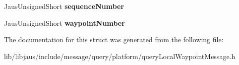 \begin{DoxyCompactItemize}
\item 
\hypertarget{struct_query_local_waypoint_message_struct_a9939e85c8d9f662b7c805a2e00319ef4}{\-Jaus\-Unsigned\-Short {\bfseries sequence\-Number}}\label{struct_query_local_waypoint_message_struct_a9939e85c8d9f662b7c805a2e00319ef4}

\item 
\hypertarget{struct_query_local_waypoint_message_struct_afbb14011b3d968d70d65007b62bbe47d}{\-Jaus\-Unsigned\-Short {\bfseries waypoint\-Number}}\label{struct_query_local_waypoint_message_struct_afbb14011b3d968d70d65007b62bbe47d}

\end{DoxyCompactItemize}


\-The documentation for this struct was generated from the following file\-:\begin{DoxyCompactItemize}
\item 
lib/libjaus/include/message/query/platform/query\-Local\-Waypoint\-Message.\-h\end{DoxyCompactItemize}
